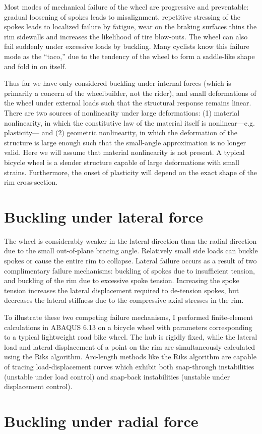 \documentclass[\rootdir/thesis.tex]{subfiles}
\begin{document}
Most modes of mechanical failure of the wheel are progressive and preventable: gradual loosening of spokes leads to misalignment, repetitive stressing of the spokes leads to localized failure by fatigue, wear on the braking surfaces thins the rim sidewalls and increases the likelihood of tire blow-outs. The wheel can also fail suddenly under excessive loads by buckling. Many cyclists know this failure mode as the ``taco,'' due to the tendency of the wheel to form a saddle-like shape and fold in on itself.


Thus far we have only considered buckling under internal forces (which is primarily a concern of the wheelbuilder, not the rider), and small deformations of the wheel under external loads such that the structural response remains linear. There are two sources of nonlinearity under large deformations: (1) material nonlinearity, in which the constitutive law of the material itself is nonlinear---e.g. plasticity--- and (2) geometric nonlinearity, in which the deformation of the structure is large enough such that the small-angle approximation is no longer valid. Here we will assume that material nonlinearity is not present. A typical bicycle wheel is a slender structure capable of large deformations with small strains. Furthermore, the onset of plasticity will depend on the exact shape of the rim cross-section.

\section{Buckling under lateral force}

The wheel is considerably weaker in the lateral direction than the radial direction due to the small out-of-plane bracing angle. Relatively small side loads can buckle spokes or cause the entire rim to collapse. Lateral failure occurs as a result of two complimentary failure mechanisms: buckling of spokes due to insufficient tension, and buckling of the rim due to excessive spoke tension. Increasing the spoke tension increases the lateral displacement required to de-tension spokes, but decreases the lateral stiffness due to the compressive axial stresses in the rim.

To illustrate these two competing failure mechanisms, I performed finite-element calculations in ABAQUS 6.13 on a bicycle wheel with parameters corresponding to a typical lightweight road bike wheel. The hub is rigidly fixed, while the lateral load and lateral displacement of a point on the rim are simultaneously calculated using the Riks algorithm. Arc-length methods like the Riks algorithm are capable of tracing load-displacement curves which exhibit both snap-through instabilities (unstable under load control) and snap-back instabilities (unstable under displacement control).



\section{Buckling under radial force}
\end{document}

